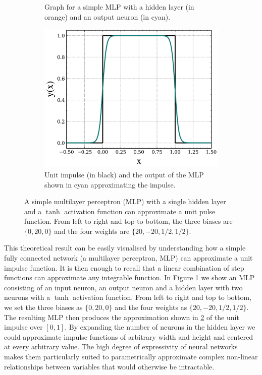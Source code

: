 \begin{figure}
\begin{subfigure}[b]{0.45\textwidth}
\begin{tikzpicture}[scale=0.2]
                    \end{tikzpicture}
        \caption{Graph for a simple MLP with a hidden layer (in orange) and an output neuron (in cyan).}
        \label{fig:MLP}
    \end{subfigure}
    \hfill
    \begin{subfigure}[b]{0.45\textwidth}
        \centering
        \includegraphics[width=1\textwidth]{img/ML/MLP_unit_impulse.png}
        \caption{Unit impulse (in black) and the output of the MLP shown in cyan approximating the impulse. }
        \label{fig:MLP_approx}
    \end{subfigure}
        \caption{A simple multilayer perceptron (MLP) with a single hidden layer and a $\tanh{}$ activation function can approximate a unit pulse function. From left to right and top to bottom, the three biases are $\{0, 20, 0\}$ and the four weights are $\{20, -20, 1/2, 1/2\}$.}
        \label{fig:ML MLP approx}
\end{figure}

This theoretical result can be easily visualised by understanding how a simple fully connected network (a multilayer perceptron, MLP) can approximate a unit impulse function. It is then enough to recall that a linear combination of step functions can approximate any integrable function. In Figure \ref{fig:MLP} we show an MLP consisting of an input neuron, an output neuron and a hidden layer with two neurons with a $\tanh{}$ activation function.
From left to right and top to bottom, we set the three biases as $\{0, 20, 0\}$ and the four weights as $\{20, -20, 1/2, 1/2\}$. The resulting MLP then produces the approximation shown in \cref{fig:MLP_approx} of the unit impulse over $[0,1]$. By expanding the number of neurons in the hidden layer we could approximate impulse functions of arbitrary width and height and centered at every arbitrary value. The high degree of expressivity of neural networks makes them particularly suited to parametrically approximate complex non-linear relationships between variables that would otherwise be intractable.

